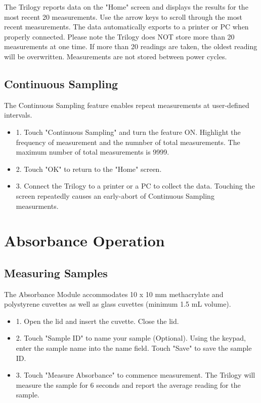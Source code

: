 \documentclass[12pt]{../SOP3_beta}
\begin{document}
\NP The Trilogy reports data on the "Home" screen and displays the results for the most recent 20 measurements. Use the arrow keys to scroll through the most recent measurements. The data automatically exports to a printer or PC when properly connected. Please note the Trilogy does NOT store more than 20 measurements at one time. If more than 20 readings are taken, the oldest reading will be overwritten. Measurements are not stored between power cycles. 

\subsection{Continuous Sampling}
\NP The Continuous Sampling feature enables repeat measurements at user-defined intervals.
\begin{itemize}
  \item 1. Touch "Continuous Sampling" and turn the feature ON. Highlight the frequency of measurement and the numnber of total measurements. The maximum number of total measurements is 9999.
  \item 2. Touch "OK" to return to the "Home" screen.
  \item 3. Connect the Trilogy to a printer or a PC to collect the data. Touching the screen repeatedly causes an early-abort of Continuous Sampling measurments. 
\end{itemize}

\section{Absorbance Operation}
\subsection{Measuring Samples}
\NP The Absorbance Module accommodates 10 x 10 mm methacrylate and polystyrene cuvettes as well as glass cuvettes (minimum 1.5 mL volume).
\begin{itemize}
  \item 1. Open the lid and insert the cuvette. Close the lid.
  \item 2. Touch "Sample ID" to name your sample (Optional). Using the keypad, enter the sample name into the name field. Touch "Save" to save the sample ID. 
  \item 3. Touch "Measure Absorbance" to commence measurement. The Trilogy will measure the sample for 6 seconds and report the average reading for the sample. 
\end{itemize}
\end{document}
